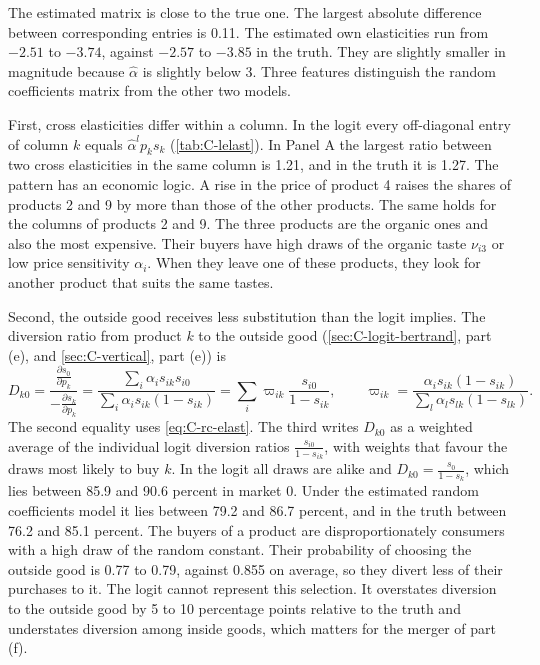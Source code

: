 The estimated matrix is close to the true one. The largest absolute difference between corresponding entries is 0.11.
The estimated own elasticities run from $-2.51$ to $-3.74$, against $-2.57$ to $-3.85$ in the truth. They are slightly
smaller in magnitude because $\hat\alpha$ is slightly below 3. Three features distinguish the random coefficients
matrix from the other two models.

First, cross elasticities differ within a column. In the logit every off-diagonal entry of column $k$ equals
$\hat\alpha^lp_ks_k$ (\cref{tab:C-lelast}). In Panel A the largest ratio between two cross elasticities in the same
column is 1.21, and in the truth it is 1.27. The pattern has an economic logic. A rise in the price of product 4 raises
the shares of products 2 and 9 by more than those of the other products. The same holds for the columns of products 2
and 9. The three products are the organic ones and also the most expensive. Their buyers have high draws of the
organic taste $\nu_{i3}$ or low price sensitivity $\alpha_i$. When they leave one of these products, they look for
another product that suits the same tastes.

Second, the outside good receives less substitution than the logit implies. The diversion ratio from product $k$ to
the outside good (\cref{sec:C-logit-bertrand}, part (e), and \cref{sec:C-vertical}, part (e)) is
\begin{equation}\label{eq:C-div0}
  D_{k0} = \frac{\frac{\partial s_0}{\partial p_k}}{-\frac{\partial s_k}{\partial p_k}}
  = \frac{\sum_i\alpha_is_{ik}s_{i0}}{\sum_i\alpha_is_{ik}(1 - s_{ik})}
  = \sum_i\varpi_{ik}\frac{s_{i0}}{1 - s_{ik}} , \qquad
  \varpi_{ik} = \frac{\alpha_is_{ik}(1 - s_{ik})}{\sum_l\alpha_ls_{lk}(1 - s_{lk})} .
\end{equation}
The second equality uses \eqref{eq:C-rc-elast}. The third writes $D_{k0}$ as a weighted average of the individual logit
diversion ratios $\frac{s_{i0}}{1 - s_{ik}}$, with weights that favour the draws most likely to buy $k$. In the logit
all draws are alike and $D_{k0} = \frac{s_0}{1 - s_k}$, which lies between 85.9 and 90.6 percent in market 0. Under the
estimated random coefficients model it lies between 79.2 and 86.7 percent, and in the truth between 76.2 and 85.1
percent. The buyers of a product are disproportionately consumers with a high draw of the random constant. Their
probability of choosing the outside good is 0.77 to 0.79, against 0.855 on average, so they divert less of their
purchases to it. The logit cannot represent this selection. It overstates diversion to the outside good by 5 to 10
percentage points relative to the truth and understates diversion among inside goods, which matters for the merger of part (f).

